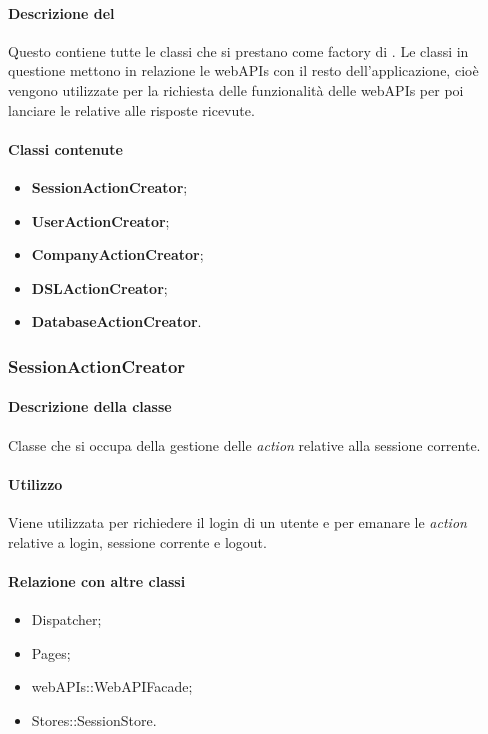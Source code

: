 \paragraph*{Descrizione del }
Questo  contiene tutte le classi che si prestano come factory di . Le classi in questione mettono in relazione le webAPIs con il resto dell'applicazione, cioè vengono utilizzate per la richiesta delle funzionalità delle webAPIs per poi lanciare le  relative alle risposte ricevute.

\paragraph*{Classi contenute}
\begin{itemize}
\item \textbf{SessionActionCreator};
\item \textbf{UserActionCreator};
\item \textbf{CompanyActionCreator};
\item \textbf{DSLActionCreator};
\item \textbf{DatabaseActionCreator}.
\end{itemize}

\subsubsection{SessionActionCreator}
\paragraph*{Descrizione della classe}
Classe che si occupa della gestione delle \textit{action} relative alla sessione corrente.

\paragraph*{Utilizzo}
Viene utilizzata per richiedere il login di un utente e per emanare le \textit{action} relative a login, sessione corrente e logout.

\paragraph*{Relazione con altre classi}
\begin{itemize}
\item Dispatcher;
\item Pages;
\item webAPIs::WebAPIFacade;
\item Stores::SessionStore.
\end{itemize}

